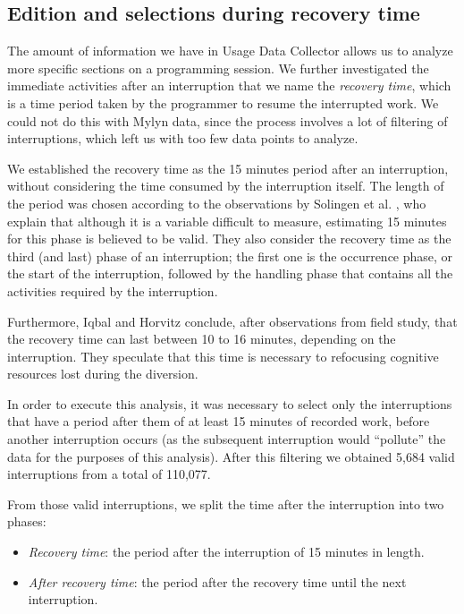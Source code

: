 \documentclass[times]{smrauth}
\newcommand\RR[1]{\textbf{Romain #1}}
\begin{document}
\subsection{Edition and selections during recovery time}
The amount of information we have in Usage Data Collector allows us to analyze more specific sections on a programming session. We further investigated the immediate activities after an interruption that we name the \textit{recovery time}, which is a time period taken by the programmer to resume the interrupted work. We could not do this with Mylyn data, since the process involves a lot of filtering of interruptions, which left us with too few data points to analyze.

We established the recovery time as the 15 minutes period after an interruption, without considering the time consumed by the interruption itself. The length of the period was chosen according to the observations by Solingen et al. \cite{SBV98}, who explain that although it is a variable difficult to measure, estimating 15 minutes for this phase is believed to be valid. They also consider the recovery time as the third (and last) phase of an interruption; the first one is the occurrence phase, or the start of the interruption, followed by the handling phase that contains all the activities required by the interruption.

Furthermore, Iqbal and Horvitz \cite{IH07} conclude, after observations from field study, that the recovery time can last between 10 to 16 minutes, depending on the interruption. They speculate that this time is necessary to refocusing cognitive resources lost during the diversion.

In order to execute this analysis, it was necessary to select only the interruptions that have a period after them of at least 15 minutes of recorded work, before another interruption occurs (as the subsequent interruption would ``pollute'' the data for the purposes of this analysis). After this filtering we obtained 5,684 valid interruptions from a total of 110,077.

From those valid interruptions, we split the time after the interruption into two phases: 

\begin{itemize}
	\item \textit{Recovery time}: the period after the interruption of 15 minutes in length.
	\item \textit{After recovery time}: the period after the recovery time until the next interruption.
\end{itemize} 
\end{document}
